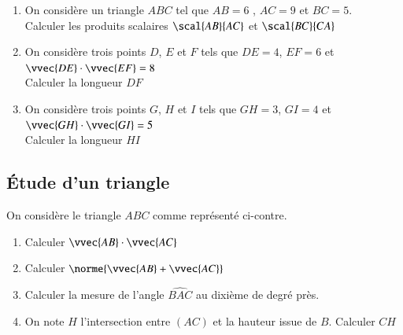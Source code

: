 \documentclass[oneside,12pt]{article}          %
\begin{document}
\begin{enumerate}
    \item On considère un triangle $ABC$ tel que $AB=6$ ,  $AC=9$ et $BC=5$.\\
    Calculer les produits scalaires $\scal{AB}{AC}$ et $\scal{BC}{CA}$
    \item On considère trois points $D$, $E$ et $F$ tels que $DE=4$, $EF=6$ et $\vvec{DE}\cdot\vvec{EF}=8$\\
    Calculer la longueur $DF$
    \item On considère trois points $G$, $H$ et $I$ tels que $GH=3$, $GI=4$ et $\vvec{GH}\cdot\vvec{GI}=5$\\
    Calculer la longueur $HI$
\end{enumerate}



\subsection{Étude d'un triangle}

\begin{minipage}{0.35\linewidth}
\end{minipage}%
\begin{minipage}{0.65\linewidth}
    On considère le triangle $ABC$ comme représenté ci-contre.
    \begin{enumerate}
        \item Calculer $\vvec{AB}\cdot\vvec{AC}$
        \item Calculer $\norme{\vvec{AB}+\vvec{AC}}$
        \item Calculer la mesure de l'angle $\widehat{BAC}$ au dixième de degré près.
        \item On note $H$ l'intersection entre $(AC)$ et la hauteur issue de $B$. Calculer $CH$
    \end{enumerate}
\end{minipage}
\end{document}

